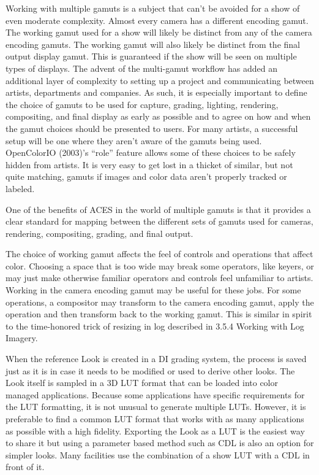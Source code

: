 Working with multiple gamuts is a subject that can’t be avoided for a show of even moderate complexity. Almost every camera has a different encoding gamut. The working gamut used for a show will likely be distinct from any of the camera encoding gamuts. The working gamut will also likely be distinct from the final output display gamut. This is guaranteed if the show will be seen on multiple types of displays. The advent of the multi-gamut workflow has added an additional layer of complexity to setting up a project and communicating between artists, departments and companies. As such, it is especially important to define the choice of gamuts to be used for capture, grading, lighting, rendering, compositing, and final display as early as possible and to agree on how and when the gamut choices should be presented to users. For many artists, a successful setup will be one where they aren’t aware of the gamuts being used. OpenColorIO (2003)’s “role” feature allows some of these choices to be safely hidden from artists. It is very easy to get lost in a thicket of similar, but not quite matching, gamuts if images and color data aren’t properly tracked or labeled.

One of the benefits of ACES in the world of multiple gamuts is that it provides a clear standard for mapping between the different sets of gamuts used for cameras, rendering, compositing, grading, and final output.

The choice of working gamut affects the feel of controls and operations that affect color. Choosing a space that is too wide may break some operators, like keyers, or may just make otherwise familiar operators and controls feel unfamiliar to artists. Working in the camera encoding gamut may be useful for these jobs. For some operations, a compositor may transform to the camera encoding gamut, apply the operation and then transform back to the working gamut. This is similar in spirit to the time-honored trick of resizing in log described in 3.5.4 Working with Log Imagery.

When the reference Look is created in a DI grading system, the process is saved just as it is in case it needs to be modified or used to derive other looks. The Look itself is sampled in a 3D LUT format that can be loaded into color managed applications. Because some applications have specific requirements for the LUT formatting, it is not unusual to generate multiple LUTs. However, it is preferable to find a common LUT format that works with as many applications as possible with a high fidelity. Exporting the Look as a LUT is the easiest way to share it but using a parameter based method such as CDL is also an option for simpler looks. Many facilities use the combination of a show LUT with a CDL in front of it.

